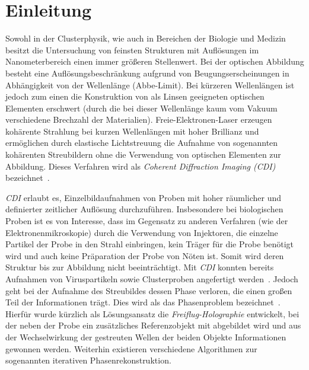 \chapter{Einleitung}
Sowohl in der Clusterphysik, wie auch in Bereichen der Biologie und Medizin besitzt die Untersuchung von feinsten Strukturen mit Auflösungen im Nanometerbereich einen immer größeren Stellenwert. Bei der optischen Abbildung besteht eine Auflösungsbeschränkung aufgrund von Beugungserscheinungen in Abhängigkeit von der Wellenlänge (Abbe-Limit). Bei kürzeren Wellenlängen ist jedoch zum einen die Konstruktion von als Linsen geeigneten optischen Elementen erschwert (durch die bei dieser Wellenlänge kaum vom Vakuum verschiedene Brechzahl der Materialien). Freie-Elektronen-Laser erzeugen kohärente Strahlung bei kurzen Wellenlängen mit hoher Brillianz und ermöglichen durch elastische Lichtstreuung die Aufnahme von sogenannten kohärenten Streubildern ohne die Verwendung von optischen Elementen zur Abbildung. Dieses Verfahren wird als \textit{Coherent Diffraction Imaging (CDI)} bezeichnet~\cite{schultz2013chapter7}.

\textit{CDI} erlaubt es, Einzelbildaufnahmen von Proben mit hoher räumlicher und definierter zeitlicher Auflösung durchzuführen. Insbesondere bei biologischen Proben ist es von Interesse, dass im Gegensatz zu anderen Verfahren (wie der Elektronenmikroskopie) durch die Verwendung von Injektoren, die einzelne Partikel der Probe in den Strahl einbringen, kein Träger für die Probe benötigt wird und auch keine Präparation der Probe von Nöten ist. Somit wird deren Struktur bis zur Abbildung nicht beeinträchtigt. Mit \textit{CDI} konnten bereits Aufnahmen von Viruspartikeln sowie Clusterproben angefertigt werden~\cite{seibert2011}. Jedoch geht bei der Aufnahme des Streubildes dessen Phase verloren, die einen großen Teil der Informationen trägt. Dies wird als das Phasenproblem bezeichnet~\cite{shechtman2015}. Hierfür wurde kürzlich als Lösungsansatz die \textit{Freiflug-Holographie} entwickelt, bei der neben der Probe ein zusätzliches Referenzobjekt mit abgebildet wird und aus der Wechselwirkung der gestreuten Wellen der beiden Objekte Informationen gewonnen werden. Weiterhin existieren verschiedene Algorithmen zur sogenannten  iterativen Phasenrekonstruktion.

